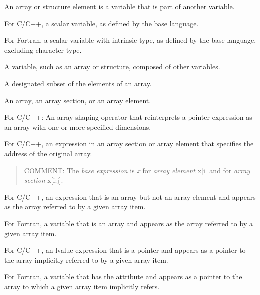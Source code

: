 \begin{adjustwidth}{-0.75in}{0in}
\begin{note}
An array or structure element is a variable that is part of another variable.
\end{note}
\end{adjustwidth}
\glossarydefend

\glossarydefstart
For C/C++, a scalar variable, as defined by the base language.

For Fortran, a scalar variable with intrinsic type, as defined by the base language,
excluding character type.
\glossarydefend

\glossarydefstart
A variable, such as an array or structure, composed of other variables.
\glossarydefend

\glossarydefstart
A designated subset of the elements of an array.
\glossarydefend

\glossarydefstart
An array, an array section, or an array element.
\glossarydefend

\glossarydefstart
For C/C++: An array shaping operator that reinterprets a pointer expression as
an array with one or more specified dimensions.
\glossarydefend

\glossarydefstart
For C/C++, an expression in an array section or array element that specifies
the address of the original array.

\begin{quote}
COMMENT: The \emph{base expression} is \emph{x} for \emph{array
element} x[i] and for \emph{array section} x[i:j].
\end{quote}
\glossarydefend

\glossarydefstart
For C/C++, an expression that is an array but not an array element and appears as the
array referred to by a given array item.

For Fortran, a variable that is an array and appears as the array referred to by a given
array item.
\glossarydefend

\glossarydefstart
For C/C++, an lvalue expression that is a pointer and appears as a pointer to the array
implicitly referred to by a given array item.

For Fortran,
a variable that has the  attribute and appears as a pointer to
the array to which a given array item implicitly refers.

